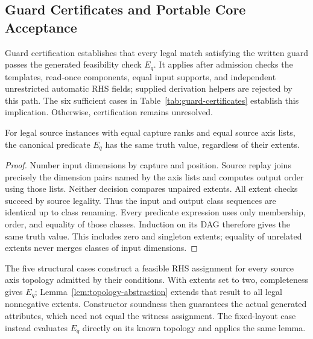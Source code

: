 \subsection{Guard Certificates and Portable Core Acceptance}
\label{app:accepted-core-proof}
Guard certification establishes that every legal match satisfying the
written guard passes the generated feasibility check $E_q$.
It applies after admission checks the templates, read-once components,
equal input supports, and independent unrestricted automatic RHS fields;
supplied derivation helpers are rejected by this path.
The six sufficient cases in Table~\ref{tab:guard-certificates} establish
this implication. Otherwise, certification remains unresolved.

\begin{lemma}
\label{lem:topology-abstraction}
For legal source instances with equal capture ranks and equal source axis
lists, the canonical predicate $E_q$ has the same truth value, regardless
of their extents.
\end{lemma}
\begin{proof}
Number input dimensions by capture and position. Source replay joins precisely
the dimension pairs named by the axis lists and computes output order using
those lists. Neither decision compares unpaired extents. All extent checks
succeed by source legality. Thus the input and output class sequences are
identical up to class renaming. Every predicate expression uses only
membership, order, and equality of those classes. Induction on its DAG
therefore gives the same truth value. This includes zero and singleton
extents; equality of unrelated extents never merges classes of input dimensions.
\end{proof}

The five structural cases construct a feasible RHS assignment for every
source axis topology admitted by their conditions. With extents set to
two, completeness gives $E_q$; Lemma~\ref{lem:topology-abstraction} extends
that result to all legal nonnegative extents. Constructor soundness then
guarantees the actual generated attributes, which need not equal the
witness assignment. The fixed-layout case instead evaluates $E_q$ directly
on its known topology and applies the same lemma.

